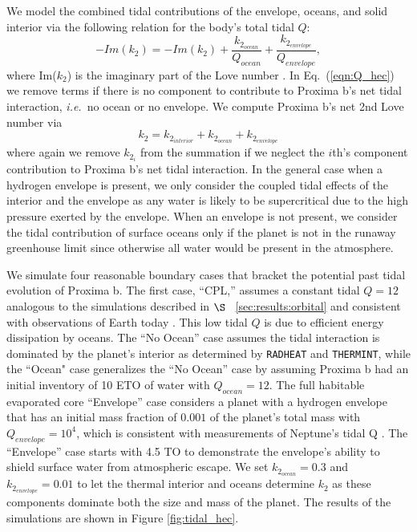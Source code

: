 \documentclass[preprint,12pt]{aastex}
\def\ie{{\it i.e.\ }}
\def\radheat{\texttt{\footnotesize{RADHEAT}}\xspace}
\def\thermint{\texttt{\footnotesize{THERMINT}}\xspace}
\begin{document}
We model the combined tidal contributions of the envelope, oceans, and
solid interior via the following relation for the body's total tidal
$Q$:
\begin{equation}
\label{eqn:Q_hec}
-Im(k_2) = -Im(k_2) + \frac{ k_{2_{ocean}}}{Q_{ocean}} +
\frac{ k_{2_{envelope}}}{Q_{envelope}},
\end{equation}
where Im($k_2$) is the imaginary part of the Love number \citep[see][]{DriscollBarnes15}. In Eq.~(\ref{eqn:Q_hec}) we remove terms if there is no 
component to contribute to Proxima b's net tidal interaction, \ie no ocean or no envelope.  We
compute Proxima b's net 2nd Love number via
\begin{equation}
\label{eqn:k2_hec}
k_2 = k_{2_{interior}} + k_{2_{ocean}} + k_{2_{envelope}}
\end{equation}
where again we remove $k_{2_{i}}$ from the summation if we neglect the
$i$th's component contribution to Proxima b's net tidal interaction.
In the general case when a hydrogen envelope is present, we only
consider the coupled tidal effects of the interior and the envelope as any
water is likely to be supercritical due to the high pressure exerted
by the envelope.  When an envelope is not present,
we consider the tidal contribution of surface oceans only if the planet is
not in the runaway greenhouse limit since otherwise all water would be present
in the atmosphere.

We simulate four reasonable boundary cases that bracket the potential
past tidal evolution of Proxima b.  The first case, ``CPL,'' assumes a
constant tidal $Q = 12$ analogous to the simulations described in
$\S$~ \ref{sec:results:orbital} and consistent with observations of
Earth today \citep{Dickey94,Williams78,Yoder95}.  This low tidal $Q$
is due to efficient energy dissipation by oceans.  The ``No Ocean''
case assumes the tidal interaction is dominated by the planet's
interior as determined by \radheat and \thermint, while the ``Ocean"
case generalizes the ``No Ocean'' case by assuming Proxima b had an
initial inventory of 10 ETO of water with $Q_{ocean} = 12$.  The full
habitable evaporated core ``Envelope'' case considers a planet with a
hydrogen envelope that has an initial mass fraction of $0.001$ of the
planet's total mass with $Q_{envelope} = 10^4$, which is consistent
with measurements of Neptune's tidal Q \citep{ZhangHamilton08}.  The
``Envelope'' case starts with 4.5 TO to demonstrate the envelope's
ability to shield surface water from atmospheric escape.  We set
$k_{2_{ocean}} = 0.3$ and $k_{2_{envelope}} = 0.01$ to let the thermal
interior and oceans determine $k_2$ as these components dominate both
the size and mass of the planet. The results of the simulations are
shown in Figure \ref{fig:tidal_hec}.
\end{document}

